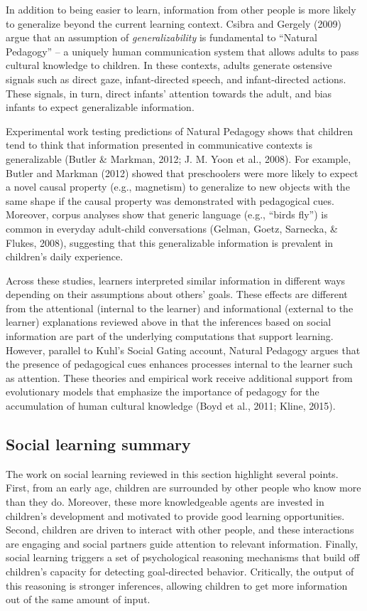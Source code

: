\documentclass[english,floatsintext,man]{apa6}
\theoremstyle{definition}
\theoremstyle{definition}
\theoremstyle{definition}
\theoremstyle{remark}
\begin{document}
In addition to being easier to learn, information from other people is
more likely to generalize beyond the current learning context. Csibra
and Gergely (2009) argue that an assumption of \emph{generalizability}
is fundamental to \enquote{Natural Pedagogy} -- a uniquely human
communication system that allows adults to pass cultural knowledge to
children. In these contexts, adults generate ostensive signals such as
direct gaze, infant-directed speech, and infant-directed actions. These
signals, in turn, direct infants' attention towards the adult, and bias
infants to expect generalizable information.

Experimental work testing predictions of Natural Pedagogy shows that
children tend to think that information presented in communicative
contexts is generalizable (Butler \& Markman, 2012; J. M. Yoon et al.,
2008). For example, Butler and Markman (2012) showed that preschoolers
were more likely to expect a novel causal property (e.g., magnetism) to
generalize to new objects with the same shape if the causal property was
demonstrated with pedagogical cues. Moreover, corpus analyses show that
generic language (e.g., \enquote{birds fly}) is common in everyday
adult-child conversations (Gelman, Goetz, Sarnecka, \& Flukes, 2008),
suggesting that this generalizable information is prevalent in
children's daily experience.

Across these studies, learners interpreted similar information in
different ways depending on their assumptions about others' goals. These
effects are different from the attentional (internal to the learner) and
informational (external to the learner) explanations reviewed above in
that the inferences based on social information are part of the
underlying computations that support learning. However, parallel to
Kuhl's Social Gating account, Natural Pedagogy argues that the presence
of pedagogical cues enhances processes internal to the learner such as
attention. These theories and empirical work receive additional support
from evolutionary models that emphasize the importance of pedagogy for
the accumulation of human cultural knowledge (Boyd et al., 2011; Kline,
2015).

\subsection{Social learning summary}\label{social-learning-summary}

The work on social learning reviewed in this section highlight several
points. First, from an early age, children are surrounded by other
people who know more than they do. Moreover, these more knowledgeable
agents are invested in children's development and motivated to provide
good learning opportunities. Second, children are driven to interact
with other people, and these interactions are engaging and social
partners guide attention to relevant information. Finally, social
learning triggers a set of psychological reasoning mechanisms that build
off children's capacity for detecting goal-directed behavior.
Critically, the output of this reasoning is stronger inferences,
allowing children to get more information out of the same amount of
input.
\end{document}
